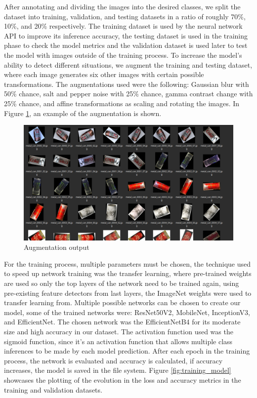 \documentclass[a4paper,11pt]{article}
\begin{document}
After annotating and dividing the images into the desired classes, we split the dataset into training, validation, and testing datasets in a ratio of roughly 70\%, 10\%, and 20\% respectively. The training dataset is used by the neural network API to improve its inference accuracy, the testing dataset is used in the training phase to check the model metrics and the validation dataset is used later to test the model with images outside of the training process. To increase the model’s ability to detect different situations, we augment the training and testing dataset, where each image generates six other images with certain possible transformations. The augmentations used were the following: Gaussian blur with 50\% chance, salt and pepper noise with 25\% chance, gamma contrast chan\-ge with 25\% chance, and affine transformations as scaling and rotating the images. In Figure \ref{fig:augmentation_example}, an example of the augmentation is shown.

\begin{figure}[H]
  \centering
  \includegraphics[scale=0.3]{Figures/Training directory example.png}
  \caption{\small{Augmentation output}}
  \label{fig:augmentation_example}
\end{figure}

For the training process, multiple parameters must be chosen, the technique used to speed up network training was the transfer learning, where pre-trained weights are used so only the top layers of the network need to be trained again, using pre-existing feature detectors from last layers, the ImageNet\cite{imagenet} weights were used to transfer learning from. Multiple possible networks can be chosen to create our model, some of the trained networks were: ResNet50V2, MobileNet, InceptionV3, and EfficientNet. The chosen network was the EfficientNetB4 for its moderate size and high accuracy in our dataset. The activation function used was the sigmoid function, since it’s an activation function that allows multiple class inferences to be made by each model prediction. After each epoch in the training process, the network is evaluated and accuracy is calculated, if accuracy increases, the model is saved in the file system. Figure \ref{fig:training_model} showcases the plotting of the evolution in the loss and accuracy metrics in the training and validation datasets.
\end{document}
